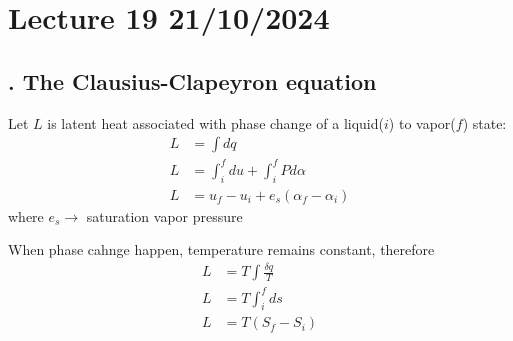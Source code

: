 \documentclass[fleqn,10pt]{SelfArx} %
\begin{document}
%
%

\clearpage

\section{Lecture 19 21/10/2024}
\subsection{. The Clausius-Clapeyron equation}
Let $L$ is latent heat associated with phase change of a liquid($i$) to vapor($f$) state:
\begin{align}
    L &= \int dq \\
    L &= \int^f_i du + \int^f_i Pd\alpha \\
    L &= u_f - u_i + e_s(\alpha_f - \alpha_i) \label{eq:latent-heat-1}
\end{align}
where $e_s \rightarrow$ saturation vapor pressure

When phase cahnge happen, temperature remains constant, therefore
\begin{align} 
    L &= T\int \frac{\delta q}{T} \\
    L &= T \int^f_i ds \\
    L &= T (S_f -S_i) \label{eq:latent-heat-2}
\end{align}
\end{document}
